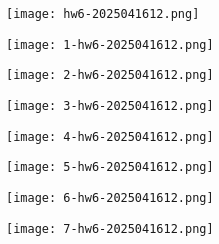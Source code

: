 \begin{exercise}
\begin{figure}[H]
\centering
\texttt{[image: hw6-2025041612.png]}
\label{}
\end{figure}
\end{exercise}
\begin{note}
\begin{figure}[H]
\centering
\texttt{[image: 1-hw6-2025041612.png]}
\label{}
\end{figure}
\end{note}
\begin{figure}[H]
\centering
\texttt{[image: 2-hw6-2025041612.png]}
\label{}
\end{figure}
\begin{figure}[H]
\centering
\texttt{[image: 3-hw6-2025041612.png]}
\label{}
\end{figure}
\begin{figure}[H]
\centering
\texttt{[image: 4-hw6-2025041612.png]}
\label{}
\end{figure}
\begin{figure}[H]
\centering
\texttt{[image: 5-hw6-2025041612.png]}
\label{}
\end{figure}
\begin{figure}[H]
\centering
\texttt{[image: 6-hw6-2025041612.png]}
\label{}
\end{figure}

\begin{exercise}
\begin{figure}[H]
\centering
\texttt{[image: 7-hw6-2025041612.png]}
\label{}
\end{figure}
\end{exercise}
